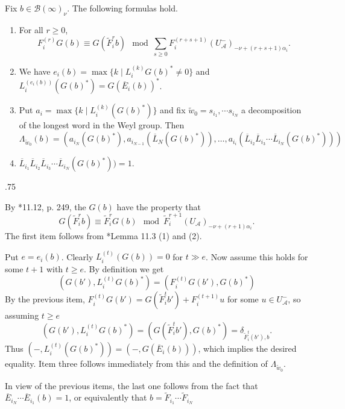 \documentclass[11pt,fleqn]{article}
\makeatletter
\renewenvironment{proof}[1][\textit{Proof}]{\par
  \pushQED{\qed}%
  \normalfont \topsep.75\paraskip\relax
  \trivlist
  \item[\hskip\labelsep
        \itshape
    #1\@addpunct{.}]\ignorespaces
}{%
  \popQED\endtrivlist\@endpefalse
}
\newcommand\A{\mathcal A}
\newcommand\B{\mathcal B}
\makeatother
\begin{document}
\begin{Lemma*}
Fix $b \in \B(\infty)_{\nu}$. The following formulas hold.
\begin{enumerate}
\item For all $r \geq 0$,
\[
  F_i^{(r)}G(b) 
    \equiv G(\tilde F_i^r b) \mod 
    \sum_{s \geq 0} F_i^{(r+s+1)}(U^-_\A)_{-\nu+(r+s+1)\alpha_i}.
\]

\item We have $e_i(b) = \max \{k \mid L_i^{(k)}G(b)^* \neq 0\}$ and
$L_i^{(e_i(b))}(G(b)^*) = G(\overline E_i(b))^*$.

\item Put $a_i = \max \{k \mid L_i^{(k)}(G(b)^*)\}$ and fix $\tilde w_0
=s_{i_1}, \cdots s_{i_N}$ a decomposition of the longest word in the Weyl 
group. Then
\[
  \Lambda_{\tilde w_0}(b)
    = (a_{i_N}(G(b)^*), a_{i_{N-1}}(\overline L_N(G(b)^*)), \ldots, 
    a_{i_i}(\overline L_{i_2} \overline L_{i_3} \cdots \overline L_{i_N}
    (G(b)^*)))
\]

\item $\overline L_{i_1} \overline L_{i_2} \overline L_{i_3} \cdots \overline 
L_{i_N} (G(b)^*)) = 1$.
\end{enumerate}
\end{Lemma*}
\begin{proof}
By \cite{Jan}*{11.12, p. 249}, the $G(b)$ have the property that
\[
  G(\tilde F_i^r b) \equiv \tilde F_i^r G(b) \mod 
    \tilde F_i^{r+1}(U_\A)_{-\nu + (r+1) \alpha_i}.
\]
The first item follows from \cite{Jan}*{Lemma 11.3 (1) and (2)}.

Put $e = e_i(b)$. Clearly $L_i^{(t)}(G(b)) = 0$ for $t \gg e$. Now assume this 
holds for some $t+1$ with $t \geq e$. By definition we get
\[
  (G(b'), L^{(t)}_i G(b)^*) = (F_i^{(t)}G(b'), G(b)^*)
\]
By the previous item, $F_i^{(t)}G(b') = G(\tilde F_i^t b') + F_i^{(t+1)}u$ 
for some $u \in U^-_\A$, so assuming $t \geq e$
\[
  (G(b'), L^{(t)}_i G(b)^*) = (G(\tilde F_i^t b'), G(b)^*) = 
  \delta_{\tilde F_i^t(b'), b}.
\]
Thus $(-, L_i^{(t)}(G(b)^*)) = (-,G(\overline E_i(b)))$, which implies the 
desired equality. Item three follows immediately from this and the definition
of $\Lambda_{\tilde w_0}$.

In view of the previous items, the last one follows from the fact that 
$\overline E_{i_N} \cdots \overline E_{i_1} (b) = 1$, or equivalently
that $b = \tilde F_{i_1} \cdots \tilde F_{i_N}^{}$
\end{proof}
\end{document}

